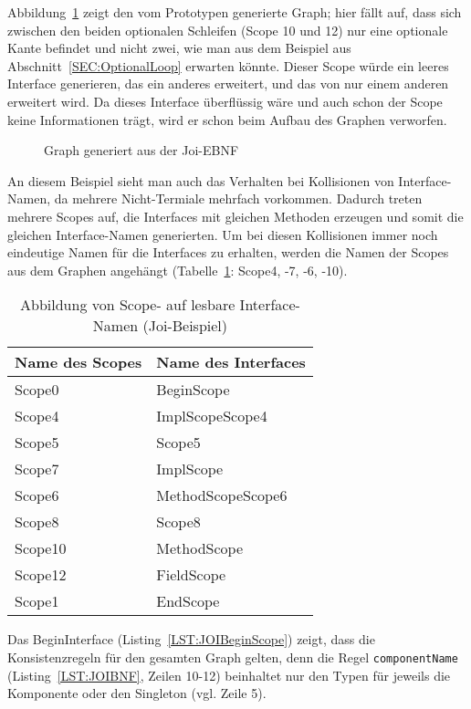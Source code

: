 \documentclass[../InterneDSLs.tex]{subfiles}
\begin{document}
Abbildung~\ref{FIG:JoiGraph} zeigt den vom Prototypen generierte Graph; hier fällt auf, dass sich zwischen den beiden optionalen Schleifen (Scope 10 und 12) nur eine optionale Kante befindet und nicht zwei, wie man aus dem Beispiel aus Abschnitt~\ref{SEC:OptionalLoop} erwarten könnte. Dieser Scope würde ein leeres Interface generieren, das ein anderes erweitert, und das von nur einem anderen erweitert wird. Da dieses Interface überflüssig wäre und auch schon der Scope keine Informationen trägt, wird er schon beim Aufbau des Graphen verworfen.
\begin{figure}[ht]
\centering
\resizebox{0.5\linewidth}{!}{}
\caption{Graph generiert aus der Joi-EBNF}
\label{FIG:JoiGraph}
\end{figure}

An diesem Beispiel sieht man auch das Verhalten bei Kollisionen von Interface-Namen, da mehrere Nicht-Termiale mehrfach vorkommen. Dadurch treten mehrere Scopes auf, die Interfaces mit gleichen Methoden erzeugen und somit die gleichen Interface-Namen generierten. Um bei diesen Kollisionen immer noch eindeutige Namen für die Interfaces zu erhalten, werden die Namen der Scopes aus dem Graphen angehängt (Tabelle~\ref{TAB:MappingJoiScopeToInterface}: Scope4, -7, -6, -10).
\begin{table}[ht]
\centering
\begin{tabular}{ll}
\textbf{Name des Scopes} & \textbf{Name des Interfaces}\\\hline
Scope0  & BeginScope\\
Scope4  & ImplScopeScope4\\
Scope5  & Scope5\\
Scope7  & ImplScope\\
Scope6  & MethodScopeScope6\\
Scope8  & Scope8\\
Scope10 & MethodScope\\
Scope12 & FieldScope\\
Scope1  & EndScope\\
\end{tabular}
\caption[Abbildung von Scope- auf Interfacenamen (Joi-Beispiel)]{Abbildung von Scope- auf lesbare Interface-Namen (Joi-Beispiel)}
\label{TAB:MappingJoiScopeToInterface}
\end{table}

Das BeginInterface (Listing~\ref{LST:JOIBeginScope}) zeigt, dass die Konsistenzregeln für den gesamten Graph gelten, denn die Regel \verb|componentName| (Listing~\ref{LST:JOIBNF}, Zeilen 10-12) beinhaltet nur den Typen für jeweils die Komponente oder den Singleton (vgl. Zeile 5).
\begin{figure}[ht]
    
\end{figure}
\end{document}

